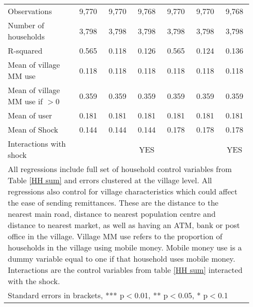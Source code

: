 \begin{table}
\begin{adjustwidth}{-1in}{-1in}
\begin{tabular}{lcccccc}
Observations & 9,770 & 9,770 & 9,768 & 9,770 & 9,770 & 9,768 \\
Number of households  & 3,798 & 3,798 & 3,798 & 3,798 & 3,798 & 3,798 \\
R-squared & 0.565 & 0.118 & 0.126 & 0.565 & 0.124 & 0.136 \\ \hline
Mean of village MM use  & 0.118 & 0.118 & 0.118 & 0.118 & 0.118 & 0.118 \\
Mean of village MM use if $>0$ & 0.359 & 0.359 & 0.359 & 0.359 & 0.359 & 0.359 \\
Mean of user & 0.181 & 0.181 & 0.181 & 0.181 & 0.181 & 0.181 \\
Mean of Shock & 0.144 & 0.144 & 0.144 & 0.178 & 0.178 & 0.178 \\
Interactions with shock &  &  & YES &  &  & YES \\ \hline
\multicolumn{7}{p{15cm}}{All regressions include full set of household control variables from Table \ref{HH sum} and errors clustered at the village level. All regressions also control for village characteristics which could affect the ease of sending remittances. These are the distance to the nearest main road, distance to nearest population centre and distance to nearest market, as well as having an ATM, bank or post office in the village. Village MM use refers to the proportion of households in the village using mobile money. Mobile money use is a dummy variable equal to one if that household uses mobile money. Interactions are the control variables from table \ref{HH sum} interacted with the shock.} \\
\multicolumn{7}{l}{ Standard errors in brackets, *** p$<$0.01, ** p$<$0.05, * p$<$0.1} 
\end{tabular}
 \end{adjustwidth}
 \end{table}
 
